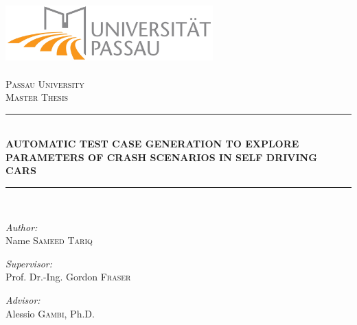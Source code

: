 \begin{titlepage}

\date{}

\begin{center}

\includegraphics[width=0.6\textwidth]{./pictures/Logo-Uni-Passau.jpg}\\[1cm]

\ \\[1cm]

\textsc{\LARGE Passau University}\\[1.5cm]

\textsc{\Large Master Thesis}\\[0.5cm]

\newcommand{\HRule}{\rule{\linewidth}{0.5mm}}
\HRule \\[0.4cm]

{  \Large \bfseries AUTOMATIC TEST CASE GENERATION TO EXPLORE PARAMETERS OF CRASH SCENARIOS IN SELF DRIVING CARS}\\[0.4cm]
\HRule \\[1.5cm]

\begin{minipage}[t]{0.45\textwidth}
\begin{flushleft} \large
\emph{Author:}\\
Name \textsc{Sameed Tariq}
\end{flushleft}
\end{minipage}
\hfill
\begin{minipage}[t]{0.45\textwidth}
\begin{flushright} \large
\emph{Supervisor:} \\
Prof. Dr.-Ing. Gordon \textsc{Fraser}\\

\vskip 0.5cm

\emph{Advisor:}\\
Alessio \textsc{Gambi}, Ph.D.
\end{flushright}
\end{minipage}

\vfill
\vfill

\vfill


\end{center}

\end{titlepage}